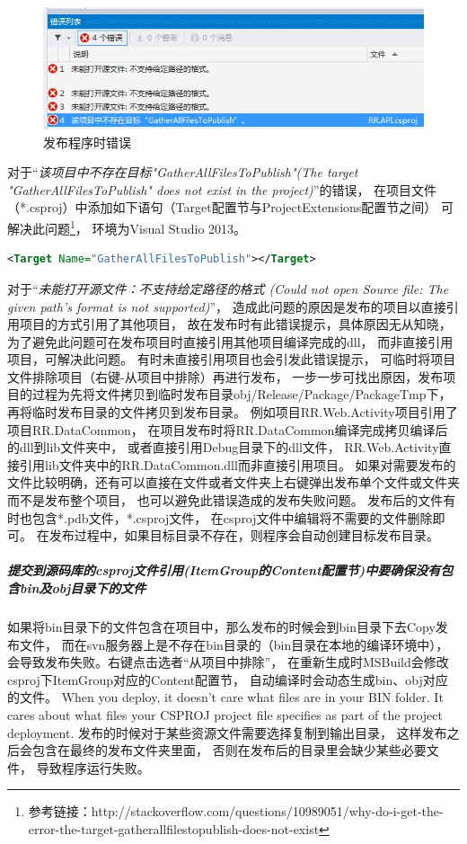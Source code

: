 \documentclass{book}
\begin{document}
\begin{figure}[htbp]
	\centering
	\includegraphics[scale=0.8]{ProgramPublishError.jpg}
	\caption{发布程序时错误}
	\label{fig:ProgramPublishError}
\end{figure}

对于“\emph{该项目中不存在目标"GatherAllFilesToPublish"(The target "GatherAllFilesToPublish" does not exist in the project)}”的错误，
在项目文件（*.csproj）中添加如下语句（Target配置节与ProjectExtensions配置节之间）
可解决此问题\footnote{参考链接：http://stackoverflow.com/questions/10989051/why-do-i-get-the-error-the-target-gatherallfilestopublish-does-not-exist}，
环境为Visual Studio 2013。

\begin{lstlisting}[language=XML]
<Target Name="GatherAllFilesToPublish"></Target>
\end{lstlisting}

对于“\emph{未能打开源文件：不支持给定路径的格式
(Could not open Source file: The given path's format is not supported)}”，
造成此问题的原因是发布的项目以直接引用项目的方式引用了其他项目，
故在发布时有此错误提示，具体原因无从知晓，
为了避免此问题可在发布项目时直接引用其他项目编译完成的dll，
而非直接引用项目，可解决此问题。
有时未直接引用项目也会引发此错误提示，
可临时将项目文件排除项目（右键-从项目中排除）再进行发布，
一步一步可找出原因，发布项目的过程为先将文件拷贝到临时发布目录obj/Release/Package/PackageTmp下，
再将临时发布目录的文件拷贝到发布目录。
例如项目RR.Web.Activity项目引用了项目RR.DataCommon，
在项目发布时将RR.DataCommon编译完成拷贝编译后的dll到lib文件夹中，
或者直接引用Debug目录下的dll文件，
RR.Web.Activity直接引用lib文件夹中的RR.DataCommon.dll而非直接引用项目。
如果对需要发布的文件比较明确，还有可以直接在文件或者文件夹上右键弹出发布单个文件或文件夹而不是发布整个项目，
也可以避免此错误造成的发布失败问题。
发布后的文件有时也包含*.pdb文件，*.csproj文件，
在csproj文件中编辑将不需要的文件删除即可。
在发布过程中，如果目标目录不存在，则程序会自动创建目标发布目录。

\subparagraph{提交到源码库的csproj文件引用(ItemGroup的Content配置节)中要确保没有包含bin及obj目录下的文件}如果将bin目录下的文件包含在项目中，那么发布的时候会到bin目录下去Copy发布文件，
而在svn服务器上是不存在bin目录的（bin目录在本地的编译环境中），
会导致发布失败。右键点击选者“从项目中排除”，
在重新生成时MSBuild会修改csproj下ItemGroup对应的Content配置节，
自动编译时会动态生成bin、obj对应的文件。
When you deploy, it doesn't care what files are in your BIN folder. 
It cares about what files your CSPROJ project file specifies as part of the project deployment. 
发布的时候对于某些资源文件需要选择复制到输出目录，
这样发布之后会包含在最终的发布文件夹里面，
否则在发布后的目录里会缺少某些必要文件，
导致程序运行失败。
\end{document}
